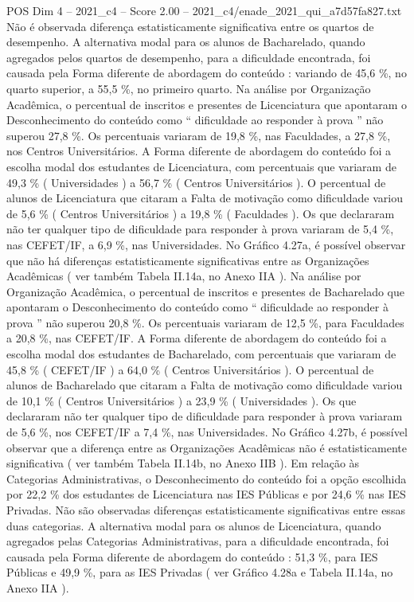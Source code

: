 \begin{textsample}{POS Dim 4 – 2021\_c4 – Score 2.00 – 2021\_c4/enade\_2021\_qui\_a7d57fa827.txt}
Não é observada diferença estatisticamente significativa entre os quartos de desempenho.
A alternativa modal para os alunos de Bacharelado, quando agregados pelos quartos de desempenho, para a dificuldade encontrada, foi causada pela Forma diferente de abordagem do conteúdo : variando de 45,6 \%, no quarto superior, a 55,5 \%, no primeiro quarto.
Na análise por Organização Acadêmica, o percentual de inscritos e presentes de Licenciatura que apontaram o Desconhecimento do conteúdo como “ dificuldade ao responder à prova ” não superou 27,8 \%.
Os percentuais variaram de 19,8 \%, nas Faculdades, a 27,8 \%, nos Centros Universitários.
A Forma diferente de abordagem do conteúdo foi a escolha modal dos estudantes de Licenciatura, com percentuais que variaram de 49,3 \% ( Universidades ) a 56,7 \% ( Centros Universitários ).
O percentual de alunos de Licenciatura que citaram a Falta de motivação como dificuldade variou de 5,6 \% ( Centros Universitários ) a 19,8 \% ( Faculdades ).
Os que declararam não ter qualquer tipo de dificuldade para responder à prova variaram de 5,4 \%, nas CEFET/IF, a 6,9 \%, nas Universidades.
No Gráfico 4.27a, é possível observar que não há diferenças estatisticamente significativas entre as Organizações Acadêmicas ( ver também Tabela II.14a, no Anexo IIA ).
Na análise por Organização Acadêmica, o percentual de inscritos e presentes de Bacharelado que apontaram o Desconhecimento do conteúdo como “ dificuldade ao responder à prova ” não superou 20,8 \%.
Os percentuais variaram de 12,5 \%, para Faculdades a 20,8 \%, nas CEFET/IF.
A Forma diferente de abordagem do conteúdo foi a escolha modal dos estudantes de Bacharelado, com percentuais que variaram de 45,8 \% ( CEFET/IF ) a 64,0 \% ( Centros Universitários ).
O percentual de alunos de Bacharelado que citaram a Falta de motivação como dificuldade variou de 10,1 \% ( Centros Universitários ) a 23,9 \% ( Universidades ).
Os que declararam não ter qualquer tipo de dificuldade para responder à prova variaram de 5,6 \%, nos CEFET/IF a 7,4 \%, nas Universidades.
No Gráfico 4.27b, é possível observar que a diferença entre as Organizações Acadêmicas não é estatisticamente significativa ( ver também Tabela II.14b, no Anexo IIB ).
Em relação às Categorias Administrativas, o Desconhecimento do conteúdo foi a opção escolhida por 22,2 \% dos estudantes de Licenciatura nas IES Públicas e por 24,6 \% nas IES Privadas.
Não são observadas diferenças estatisticamente significativas entre essas duas categorias.
A alternativa modal para os alunos de Licenciatura, quando agregados pelas Categorias Administrativas, para a dificuldade encontrada, foi causada pela Forma diferente de abordagem do conteúdo : 51,3 \%, para IES Públicas e 49,9 \%, para as IES Privadas ( ver Gráfico 4.28a e Tabela II.14a, no Anexo IIA ).

\end{textsample}
